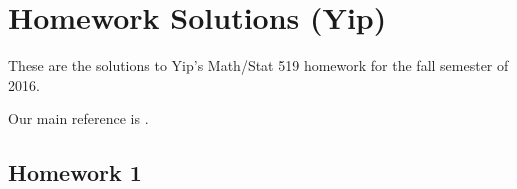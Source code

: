 \section{Homework Solutions (Yip)}
These are the solutions to Yip's Math/Stat 519 homework for the fall
semester of 2016.

Our main reference is \cite{ross}.

\subsection{Homework 1}
\begin{problem}[R]
\end{problem}
\begin{solution*}
\end{solution*}




